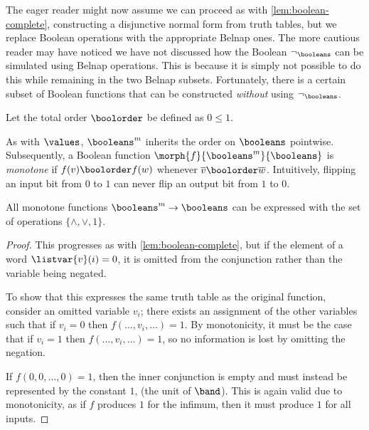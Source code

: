 The eager reader might now assume we can proceed as with
\cref{lem:boolean-complete},
constructing a disjunctive normal form from truth tables, but we replace Boolean
operations with the appropriate Belnap ones.
The more cautious reader may have noticed we have not discussed how the
Boolean \(\neg_\booleans\) can be simulated using Belnap operations.
This is because it is simply not possible to do this while remaining in the
two Belnap subsets.
Fortunately, there is a certain subset of Boolean functions that can be
constructed \emph{without} using \(\neg_\booleans\).

\begin{definition}
    Let the total order \(\boolorder\) be defined as \(0 \leq 1\).
\end{definition}

As with \(\values\), \(\booleans^m\) inherits the order on \(\booleans\)
pointwise.
Subsequently, a Boolean function \(\morph{f}{\booleans^m}{\booleans}\) is
\emph{monotone} if \(f(v) \boolorder f(w)\) whenever
\(\overline{v} \boolorder \overline{w}\).
Intuitively, flipping an input bit from \(0\) to \(1\) can never flip an output
bit from \(1\) to \(0\).

\begin{lemma}
    \label{lem:boolean-complete-monotone}
    All monotone functions \(\booleans^m \to \booleans\) can be expressed with
    the set of operations \(\{\land,\lor,1\}\).
\end{lemma}
\begin{proof}
    This progresses as with \cref{lem:boolean-complete}, but if the element of
    a word \(\listvar{v}(i) = 0\), it is omitted from the conjunction
    rather than the variable being negated.

    To show that this expresses the same truth table as the original function,
    consider an omitted variable \(v_i\); there exists an assignment of the
    other variables such that if \(v_i = 0\) then \(f(\dots, v_i, \dots) = 1\).
    By monotonicity, it must be the case that if \(v_i = 1\) then
    \(f(\dots, v_i, \dots) = 1\), so no information is lost by omitting
    the negation.

    If \(f(0, 0, \dots, 0) = 1\), then the inner conjunction is empty and must
    instead be represented by the constant \(1\), (the unit of \(\band\)).
    This is again valid due to monotonicity, as if \(f\) produces \(1\) for the
    infimum, then it must produce \(1\) for all inputs.
\end{proof}

